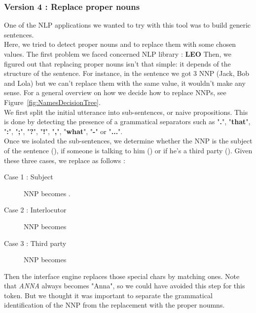 \subsubsection{Version 4 : Replace proper nouns} %
\label{ssub:version_4_replace_proper_nouns}
One of the NLP applications we wanted to try with this tool was to build generic sentences.\\
Here, we tried to detect proper nouns and to replace them with some chosen values. The first problem we faced concerned NLP library : \textbf{LEO}
Then, we figured out that replacing proper nouns isn't that simple: it depends of the structure of the sentence.
For instance, in the sentence  we got 3 NNP (Jack, Bob and Lola) but we can't replace them with the same value, it wouldn't make any sense.
For a general overview on how we decide how to replace NNPs, see Figure~\ref{fig:NamesDecisionTree}. \\
We first split the initial utterance into sub-sentences, or naive propositions.
This is done by detecting the presence of a grammatical separators such as "\textbf{.}", "\textbf{that}", "\textbf{:}", "\textbf{;}", "\textbf{?}", "\textbf{!}", "\textbf{,}", "\textbf{what}", "\textbf{-}" or "\textbf{...}".\\
Once we isolated the sub-sentences, we determine whether the NNP is the subject of the sentence (), if someone is talking to him () or if he's a third party ().
Given these three cases, we replace as follows :
\begin{description}
    \item[Case 1 : Subject] NNP becomes .
    \item[Case 2 : Interlocutor] NNP becomes 
    \item[Case 3 : Third party] NNP becomes 
\end{description}
Then the interface engine replaces those special chars by matching ones.
Note that \textit{ANNA} always becomes "Anna", so we could have avoided this step for this token.
But we thought it was important to separate the grammatical identification of the NNP from the replacement with the proper noumns.

